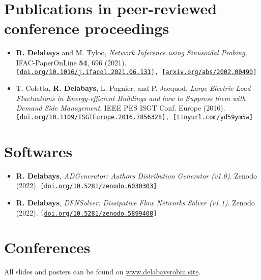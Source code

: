 \documentclass[10pt]{article}
\begin{document}
\section*{Publications in peer-reviewed conference proceedings}
\begin{itemize}
  \item \textcolor{hei}{\bf R. Delabays} and M. Tyloo,
 \textit{Network Inference using Sinusoidal Probing}, IFAC-PaperOnLine {\bf 54}, 696 (2021).
 {\footnotesize \tt [\url{doi.org/10.1016/j.ifacol.2021.06.131}], [\url{arxiv.org/abs/2002.00490}]}

 \item T. Coletta, \textcolor{hei}{\bf R. Delabays}, L. Pagnier, and P. Jacquod, 
 \textit{Large Electric Load Fluctuations in Energy-efficient Buildings and how to Suppress them with Demand Side Management}, 
 IEEE PES ISGT Conf. Europe (2016).
 {\footnotesize \tt [\url{doi.org/10.1109/ISGTEurope.2016.7856328}], [\url{tinyurl.com/yd59ym5w}]}
\end{itemize}


\section*{Softwares}
\begin{itemize}
 \item \textcolor{hei}{\bf R. Delabays},
 \textit{ADGenerator: Authors Distribution Generator (v1.0)}. Zenodo (2022).
 {\footnotesize \tt [\url{doi.org/10.5281/zenodo.6030303}]}
  
 \item \textcolor{hei}{\bf R. Delabays},
 \textit{DFNSolver: Dissipative Flow Networks Solver (v1.1)}. Zenodo (2022). 
 {\footnotesize \tt [\url{doi.org/10.5281/zenodo.5899408}]}
\end{itemize} 


\section*{Conferences}
All slides and posters can be found on \url{www.delabaysrobin.site}.
\end{document}
